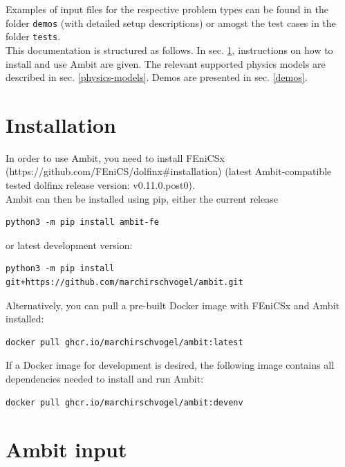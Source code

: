 \documentclass[a4paper,12pt]{report}
\begin{document}
Examples of input files for the respective problem types can be found in the folder \verb"demos" (with detailed setup descriptions) or amogst the test cases in the folder \verb"tests".\\

This documentation is structured as follows. In sec. \ref{installation}, instructions on how to install and use Ambit are given. The relevant supported physics models are described in sec. \ref{physics-models}. Demos are presented in sec. \ref{demos}.


\section{Installation}\label{installation}

In order to use Ambit, you need to install FEniCSx (https://github.com/FEniCS/dolfinx\#installation) (latest Ambit-compatible tested dolfinx release version: v0.11.0.post0).\\

Ambit can then be installed using pip, either the current release
\begin{verbatim}
python3 -m pip install ambit-fe
\end{verbatim}

or latest development version:
\begin{verbatim}
python3 -m pip install git+https://github.com/marchirschvogel/ambit.git
\end{verbatim}

Alternatively, you can pull a pre-built Docker image with FEniCSx and Ambit installed:
\begin{verbatim}
docker pull ghcr.io/marchirschvogel/ambit:latest
\end{verbatim}

If a Docker image for development is desired, the following image contains all dependencies needed to install and run Ambit:
\begin{verbatim}
docker pull ghcr.io/marchirschvogel/ambit:devenv
\end{verbatim}

\section{Ambit input}
\end{document}
